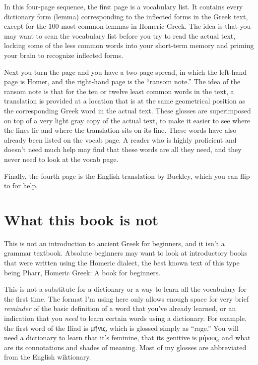 {In this four-page sequence, the first page is a vocabulary list. It
contains every dictionary form (lemma) corresponding to the inflected
forms in the Greek text, except for the 100 most common lemmas in
Homeric Greek. The idea is that you may want to scan the vocabulary
list before you try to read the actual text, locking some of the less
common words into your short-term memory and priming your brain to
recognize inflected forms.

Next you turn the page and you have a two-page spread, in which the
left-hand page is Homer, and the right-hand page is the ``ransom note.''
The idea of the ransom note is that for the ten or twelve least common
words in the text, a translation is provided at a location that is at
the same geometrical position as the corresponding Greek word in the
actual text. These glosses are superimposed on top of a very light
gray copy of the actual text, to make it easier to see where the lines
lie and where the translation sits on its line. These words have also
already been listed on the vocab page. A reader who is highly
proficient and doesn't need much help may find that these words are
all they need, and they never need to look at the vocab page.

Finally, the fourth page is the English translation by Buckley, which you can flip to for help.

\section*{What this book is not}

This is not an introduction to ancient Greek for beginners, and it isn't a grammar textbook.
Absolute beginners may want to look at introductory books that were written using the Homeric
dialect, the best known text of this type being Pharr, Homeric Greek: A book for beginners.

This is not a substitute for a dictionary or a way to learn all the vocabulary for the first
time. The format I'm using here only allows enough space
for very brief \emph{reminder} of the basic definition of a word that you've already learned,
or an indication that you \emph{need} to learn certain words using a dictionary. For example,
the first word of the Iliad is μῆνις, which is glossed simply as ``rage.'' You will need a
dictionary to learn that it's feminine, that its genitive is μήνιος, and what are its connotations
and shades of meaning. Most of my glosses are abbreviated from the English wiktionary.

}
